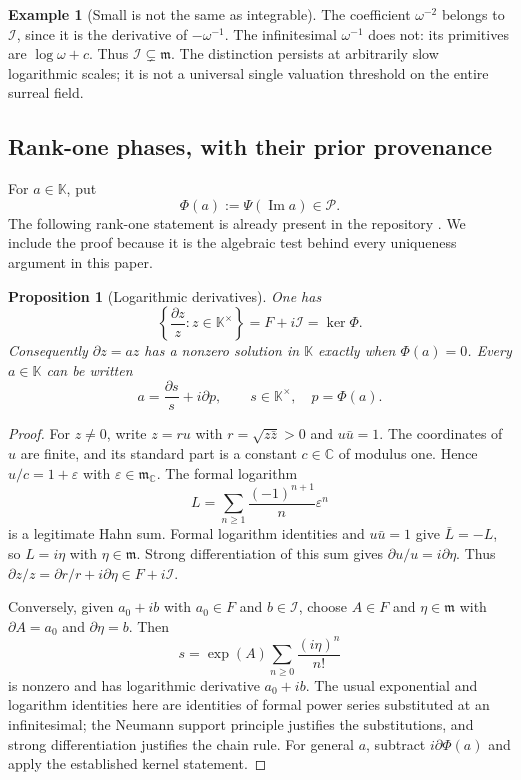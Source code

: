 \documentclass[11pt,a4paper]{article}
\numberwithin{equation}{section}
\newtheorem{proposition}[proposition]{Proposition}
\theoremstyle{definition}
\newtheorem{example}[example]{Example}
\theoremstyle{remark}
\newcommand{\K}{\mathbb K}
\newcommand{\C}{\mathbb C}
\newcommand{\mm}{\mathfrak m}
\newcommand{\PP}{\mathcal P}
\newcommand{\II}{\mathcal I}
\begin{document}
\begin{example}[Small is not the same as integrable]
The coefficient $\omega^{-2}$ belongs to $\II$, since it is the derivative
of $-\omega^{-1}$. The infinitesimal $\omega^{-1}$ does not: its primitives
are $\log\omega+c$. Thus $\II\subsetneq\mm$. The distinction persists at
arbitrarily slow logarithmic scales; it is not a universal single valuation
threshold on the entire surreal field.
\end{example}

\subsection{Rank-one phases, with their prior provenance}
For $a\in\K$, put
\begin{equation}\label{eq:Phi}
 \Phi(a):=\Psi(\operatorname{Im}a)\in\PP.
\end{equation}
The following rank-one statement is already present in the repository
\cite{RepoDE}. We include the proof because it is the algebraic test behind
every uniqueness argument in this paper.

\begin{proposition}[Logarithmic derivatives]\label{prop:dlog}
One has
\begin{equation}\label{eq:dlog}
 \left\{\frac{\partial z}{z}:z\in\K^\times\right\}
   =F+i\II=\ker\Phi.
\end{equation}
Consequently $\partial z=az$ has a nonzero solution in $\K$ exactly when
$\Phi(a)=0$. Every $a\in\K$ can be written
\begin{equation}\label{eq:rankone}
 a=\frac{\partial s}{s}+i\partial p,
 \qquad s\in\K^\times,\quad p=\Phi(a).
\end{equation}
\end{proposition}
\begin{proof}
For $z\ne0$, write $z=ru$ with $r=\sqrt{z\bar z}>0$ and $u\bar u=1$.
The coordinates of $u$ are finite, and its standard part is a constant
$c\in\C$ of modulus one. Hence $u/c=1+\varepsilon$ with
$\varepsilon\in\mm_{\C}$. The formal logarithm
\[
 L=\sum_{n\ge1}\frac{(-1)^{n+1}}{n}\varepsilon^n
\]
is a legitimate Hahn sum. Formal logarithm identities and $u\bar u=1$
give $\bar L=-L$, so $L=i\eta$ with $\eta\in\mm$. Strong differentiation
of this sum gives $\partial u/u=i\partial\eta$. Thus
$\partial z/z=\partial r/r+i\partial\eta\in F+i\II$.

Conversely, given $a_0+ib$ with $a_0\in F$ and $b\in\II$, choose
$A\in F$ and $\eta\in\mm$ with $\partial A=a_0$ and
$\partial\eta=b$. Then
\[
 s=\exp(A)\sum_{n\ge0}\frac{(i\eta)^n}{n!}
\]
is nonzero and has logarithmic derivative $a_0+ib$. The usual exponential
and logarithm identities here are identities of formal power series
substituted at an infinitesimal; the Neumann support principle justifies
the substitutions, and strong differentiation justifies the chain rule.
For general $a$, subtract $i\partial\Phi(a)$ and apply the established
kernel statement.
\end{proof}
\end{document}
